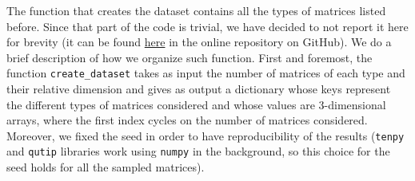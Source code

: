 \documentclass[a4paper,11pt]{article}
\begin{document}
\noindent The function that creates the dataset contains all the types of matrices listed before. Since that part of the code is trivial, we have decided to not report it here for brevity (it can be found \href{https://github.com/nunziacerrato/Numerical_Analysis_Optimization/blob/main/Project_1/Project_1.py}{here} in the online repository on GitHub). We do a brief description of how we organize such function. First and foremost, the function \texttt{create_dataset} takes as input the number of matrices of each type and their relative dimension and gives as output a dictionary whose keys represent the different types of matrices considered and whose values are 3-dimensional arrays, where the first index cycles on the number of matrices considered.
Moreover, we fixed the seed in order to have reproducibility of the results (\texttt{tenpy} and \texttt{qutip} libraries work using \texttt{numpy} in the background, so this choice for the seed holds for all the sampled matrices).
%
%
\end{document}
